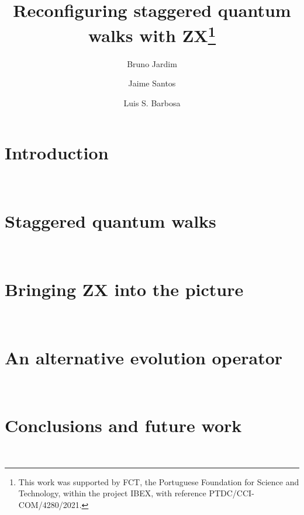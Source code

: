 \documentclass{llncs}
\begin{document}
%

\title{Reconfiguring staggered quantum walks with ZX\thanks{This work was supported by FCT, the Portuguese Foundation for Science and Technology, within the project IBEX, with reference PTDC/CCI-COM/4280/2021.}}

%
%
\author{Bruno Jardim  \and Jaime Santos \and Luis S. Barbosa}
%
%


\maketitle

\begin{abstract}
    
\end{abstract}

\section{Introduction}
\label{sec:introduction}

~\\

\section{Staggered quantum walks}
\label{sec:staggered}

~\\
%

\section{Bringing ZX into the picture}
\label{sec:sqw}

~\\

\section{An alternative evolution operator}
\label{sec:ev-op}

~\\

\section{Conclusions and future work}
\label{sec:conclusion}

~\\




\end{document}
